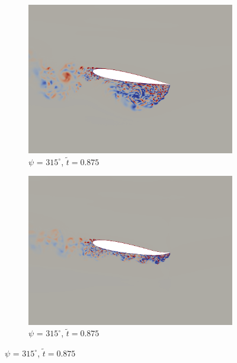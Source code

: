 \begin{figure}[H]
\begin{subfigure}[b]{0.4\textwidth}
	\centering
	\includegraphics[width=1\textwidth]{figures/mu_2pt0/vorticity/baseline/phase_315.png}
	\caption{ $\psi$ = $315^\circ$, $\tilde{t}=0.875$}
	\label{fig:mu_2pt0_non-actuated_psi315}
\end{subfigure}
\begin{subfigure}[b]{0.4\textwidth}
	\centering
	\includegraphics[width=1\textwidth]{figures/mu_2pt0/vorticity/AC/phase_315.png}
	\caption{ $\psi$ = $315^\circ$, $\tilde{t}=0.875$}
	\label{fig:mu_2pt0_AC_psi315}
\end{subfigure}


\end{figure}
